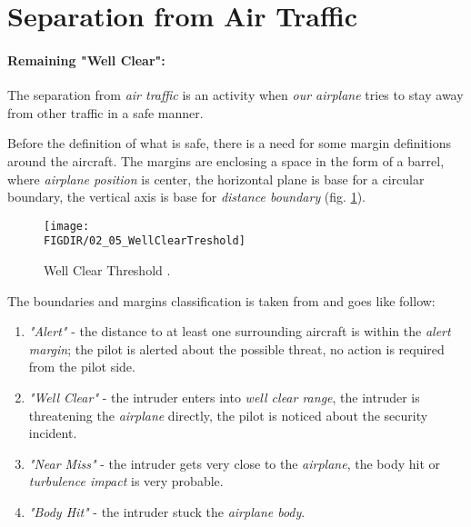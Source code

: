 \section{Separation from Air Traffic}\label{sec:WellClear}

\paragraph{Remaining "Well Clear":} The separation from \emph{air traffic} is an activity when \emph{our airplane} tries to stay away from other traffic in a safe manner.  

Before the definition of what is safe, there is a need for some margin definitions around the aircraft. The margins are enclosing a space in the form of a barrel, where \emph{airplane position} is center, the horizontal plane is base for a circular boundary, the vertical axis is base for \emph{distance boundary} (fig. \ref{fig:WellClearTreshold}).

\begin{figure}[H]
    \centering
    \texttt{[image: \\FIGDIR/02\_05\_WellClearTreshold]}
    \caption{Well Clear Threshold \cite{valavanis2015uav,united1983pilots}.}
    \label{fig:WellClearTreshold}
\end{figure}

\noindent The boundaries and margins classification is taken from \cite{united1983pilots,valavanis2015uav} and goes like follow:

\begin{enumerate}
    \item \emph{"Alert"} - the distance to at least one surrounding aircraft is within the \emph{alert margin}; the pilot is alerted about the possible threat, no action is required from the pilot side.
    
    \item \emph{"Well Clear"} - the intruder enters into \emph{well clear range}, the intruder is threatening the \emph{airplane} directly, the pilot is noticed about the security incident.
    
    \item \emph{"Near Miss"} - the intruder gets very close to the \emph{airplane}, the body hit or \emph{turbulence impact} is very probable. 
    
    \item \emph{"Body Hit"} - the intruder stuck the \emph{airplane body}.
\end{enumerate}

